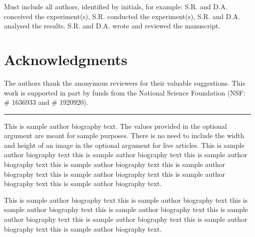 \documentclass[unnumsec,webpdf,contemporary,large]{oup-authoring-template}%
\theoremstyle{thmstyleone}%
\theoremstyle{thmstyletwo}%
\theoremstyle{thmstylethree}%
\begin{document}
Must include all authors, identified by initials, for example:
S.R. and D.A. conceived the experiment(s),  S.R. conducted the experiment(s), S.R. and D.A. analysed the results.  S.R. and D.A. wrote and reviewed the manuscript.

\section{Acknowledgments}
The authors thank the anonymous reviewers for their valuable suggestions. This work is supported in part by funds from the National Science Foundation (NSF: \# 1636933 and \# 1920920).





%
%


\begin{biography}{{\color{black!20}\rule{77pt}{77pt}}}{\author{Author Name.} This is sample author biography text. The values provided in the optional argument are meant for sample purposes. There is no need to include the width and height of an image in the optional argument for live articles. This is sample author biography text this is sample author biography text this is sample author biography text this is sample author biography text this is sample author biography text this is sample author biography text this is sample author biography text this is sample author biography text.}
\end{biography}

\begin{biography}{}{\author{Author Name.} This is sample author biography text this is sample author biography text this is sample author biography text this is sample author biography text this is sample author biography text this is sample author biography text this is sample author biography text this is sample author biography text.}
\end{biography}
\end{document}
